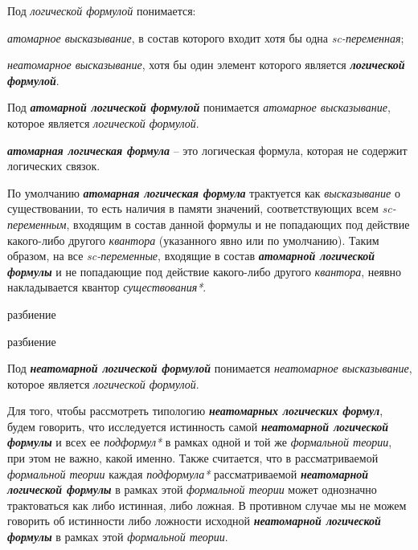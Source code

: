 Под \textit{логической формулой} понимается:
\begin{textitemize}
	\item \textit{атомарное высказывание}, в состав которого входит хотя бы одна \textit{sc-переменная};
	\item \textit{неатомарное высказывание}, хотя бы один элемент которого является \textbf{\textit{логической формулой}}.
\end{textitemize}

Под \textbf{\textit{атомарной логической формулой}} понимается \textit{атомарное высказывание}, которое является \textit{логической формулой}.

\textbf{\textit{атомарная логическая формула}} -- это  логическая формула, которая не содержит логических связок.

По умолчанию \textbf{\textit{атомарная логическая формула}} трактуется как \textit{высказывание} о существовании, то есть наличия в памяти значений, соответствующих всем \textit{sc-переменным}, входящим в состав данной формулы и не попадающих под действие какого-либо другого \textit{квантора} (указанного явно или по умолчанию). Таким образом, на все \textit{sc-переменные}, входящие в состав \textbf{\textit{атомарной логической формулы}} и не попадающие под действие какого-либо другого \textit{квантора}, неявно накладывается квантор \textit{существования*}.

\begin{SCn}
\begin{scnrelfromset}{разбиение}
\end{scnrelfromset}
\begin{scnrelfromset}{разбиение}
\end{scnrelfromset}
\end{SCn}

Под \textbf{\textit{неатомарной логической формулой}} понимается \textit{неатомарное высказывание}, которое является \textit{логической формулой}.

Для того, чтобы рассмотреть типологию \textbf{\textit{неатомарных логических формул}}, будем говорить, что исследуется истинность самой \textbf{\textit{неатомарной логической формулы}} и всех ее \textit{подформул*} в рамках одной и той же \textit{формальной теории}, при этом не важно, какой именно. Также считается, что в рассматриваемой \textit{формальной теории} каждая \textit{подформула*} рассматриваемой \textbf{\textit{неатомарной логической формулы}} в рамках этой \textit{формальной теории} может однозначно трактоваться как либо истинная, либо ложная. В противном случае мы не можем говорить об истинности либо ложности исходной \textbf{\textit{неатомарной логической формулы}} в рамках этой \textit{формальной теории}.

